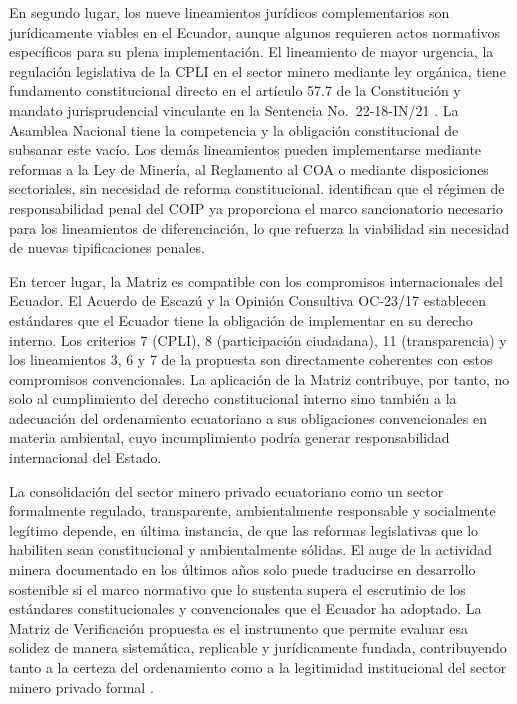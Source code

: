 En segundo lugar, los nueve lineamientos jurídicos complementarios son jurídicamente viables en el Ecuador, aunque algunos requieren actos normativos específicos para su plena implementación. El lineamiento de mayor urgencia, la regulación legislativa de la CPLI en el sector minero mediante ley orgánica, tiene fundamento constitucional directo en el artículo 57.7 de la Constitución \parencite{cre_2008} y mandato jurisprudencial vinculante en la Sentencia No.\ 22-18-IN/21 \parencite{cce_22_18_in_21}. La Asamblea Nacional tiene la competencia y la obligación constitucional de subsanar este vacío. Los demás lineamientos pueden implementarse mediante reformas a la Ley de Minería, al Reglamento al COA o mediante disposiciones sectoriales, sin necesidad de reforma constitucional. \textcite{robalino_altamirano_2025} identifican que el régimen de responsabilidad penal del COIP ya proporciona el marco sancionatorio necesario para los lineamientos de diferenciación, lo que refuerza la viabilidad sin necesidad de nuevas tipificaciones penales.

En tercer lugar, la Matriz es compatible con los compromisos internacionales del Ecuador. El Acuerdo de Escazú \parencite{acuerdo_escazu_2018} y la Opinión Consultiva OC-23/17 \parencite{corte_idh_oc23_2017} establecen estándares que el Ecuador tiene la obligación de implementar en su derecho interno. Los criterios 7 (CPLI), 8 (participación ciudadana), 11 (transparencia) y los lineamientos 3, 6 y 7 de la propuesta son directamente coherentes con estos compromisos convencionales. La aplicación de la Matriz contribuye, por tanto, no solo al cumplimiento del derecho constitucional interno sino también a la adecuación del ordenamiento ecuatoriano a sus obligaciones convencionales en materia ambiental, cuyo incumplimiento podría generar responsabilidad internacional del Estado.

La consolidación del sector minero privado ecuatoriano como un sector formalmente regulado, transparente, ambientalmente responsable y socialmente legítimo depende, en última instancia, de que las reformas legislativas que lo habiliten sean constitucional y ambientalmente sólidas. El auge de la actividad minera documentado en los últimos años \parencite{lahora_boom_minero_2025} solo puede traducirse en desarrollo sostenible si el marco normativo que lo sustenta supera el escrutinio de los estándares constitucionales y convencionales que el Ecuador ha adoptado. La Matriz de Verificación propuesta es el instrumento que permite evaluar esa solidez de manera sistemática, replicable y jurídicamente fundada, contribuyendo tanto a la certeza del ordenamiento como a la legitimidad institucional del sector minero privado formal \parencite{grefa_valencia_2021,medina_garcia_2026}.
